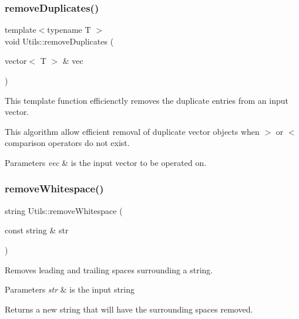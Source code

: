 \subsubsection{\texorpdfstring{remove\+Duplicates()}{removeDuplicates()}}
{\footnotesize\ttfamily template$<$typename T $>$ \\
void Utils\+::remove\+Duplicates (\begin{DoxyParamCaption}\item[{vector$<$ T $>$ \&}]{vec }\end{DoxyParamCaption})}



This template function efficienctly removes the duplicate entries from an input vector. 

This algorithm allow efficient removal of duplicate vector objects when $>$ or $<$ comparison operators do not exist. 
\begin{DoxyParams}{Parameters}
{\em vec} & is the input vector to be operated on. \\
\hline
\end{DoxyParams}
\mbox{\label{namespace_utils_aaa3265ae19d2fbd675a9d47d46f62b11}} 
\subsubsection{\texorpdfstring{remove\+Whitespace()}{removeWhitespace()}}
{\footnotesize\ttfamily string Utils\+::remove\+Whitespace (\begin{DoxyParamCaption}\item[{const string \&}]{str }\end{DoxyParamCaption})}



Removes leading and trailing spaces surrounding a string. 


\begin{DoxyParams}{Parameters}
{\em str} & is the input string \\
\hline
\end{DoxyParams}
\begin{DoxyReturn}{Returns}
a new string that will have the surrounding spaces removed. 
\end{DoxyReturn}
\mbox{\label{namespace_utils_aadb08a5b50d04b076f4348a8f752932b}} 
